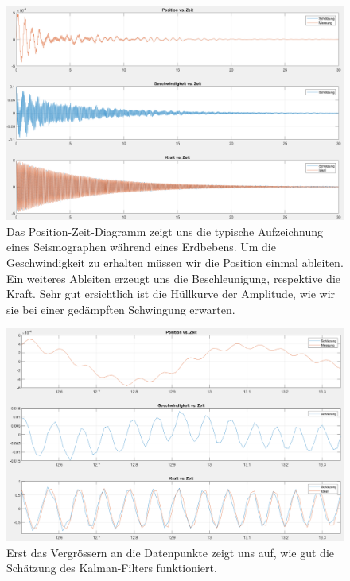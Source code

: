\begin{figure}
	\begin{center}
		\includegraphics[width=\linewidth,keepaspectratio]{papers/erdbeben/Standard_alles.PNG}
		\caption{Das Position-Zeit-Diagramm zeigt uns die typische Aufzeichnung eines Seismographen während eines Erdbebens. Um die Geschwindigkeit zu erhalten müssen wir die Position einmal ableiten. Ein weiteres Ableiten erzeugt uns die Beschleunigung, respektive die Kraft. Sehr gut ersichtlich ist die Hüllkurve der Amplitude, wie wir sie bei einer gedämpften Schwingung erwarten.}
    \label{erdbeben:fig:standard-alles}
	\end{center}
\end{figure}

\begin{figure}
	\begin{center}
		\includegraphics[width=\linewidth,keepaspectratio]{papers/erdbeben/Standard_Zoom.PNG}
		\caption{Erst das Vergrössern an die Datenpunkte zeigt uns auf, wie gut die Schätzung des Kalman-Filters funktioniert.}
    \label{erdbeben:fig:standard-zoom}
	\end{center}
\end{figure}


